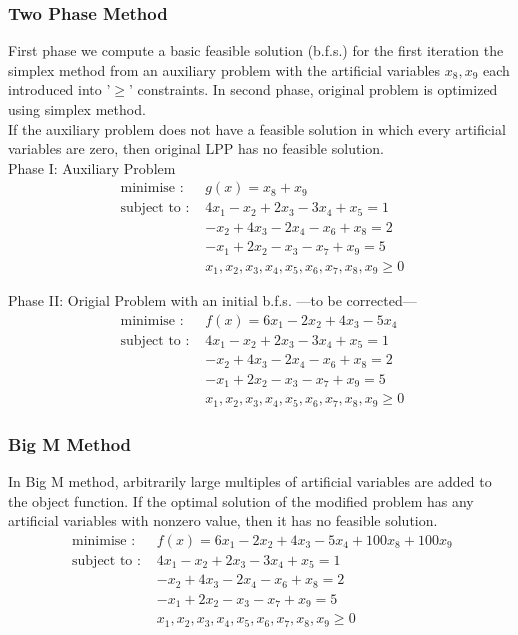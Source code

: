 \subsubsection{Two Phase Method}
First phase we compute a basic feasible solution (b.f.s.) for the first iteration the simplex method from an auxiliary problem with the artificial variables $x_8,x_9$ each introduced into '$\ge$' constraints. In second phase, original problem is optimized using simplex method.\\

	If the auxiliary problem does not have a feasible solution in which every artificial variables are zero, then original LPP has no feasible solution.\\

Phase I: Auxiliary Problem
\begin{align*}
	\text{ minimise : } & g(x) = x_8 + x_9 \\
\text{ subject to : } & 4x_1 - x_2 + 2x_3 - 3x_4 + x_5 = 1 \\
& -x_2 + 4x_3 - 2x_4 - x_6 + x_8 = 2 \\
& -x_1 + 2x_2 - x_3 - x_7 + x_9 = 5 \\
& x_1,x_2,x_3,x_4,x_5,x_6,x_7,x_8,x_9 \ge  0
\end{align*}

Phase II: Origial Problem with an initial b.f.s. 
---to be corrected---
\begin{align*}
	\text{ minimise : } & f(x) = 6x_1 - 2x_2 +4x_3 - 5x_4 \\
\text{ subject to : } & 4x_1 - x_2 + 2x_3 - 3x_4 + x_5 = 1 \\
& -x_2 + 4x_3 - 2x_4 - x_6 + x_8 = 2 \\
& -x_1 + 2x_2 - x_3 - x_7 + x_9 = 5 \\
& x_1,x_2,x_3,x_4,x_5,x_6,x_7,x_8,x_9 \ge  0
\end{align*}

\subsubsection{Big M Method}
In Big M method, arbitrarily large multiples of artificial variables are added to the object function. If the optimal solution of the modified problem has any artificial variables with nonzero value, then it has no feasible solution.
\begin{align*}
	\text{ minimise : } & f(x) = 6x_1 - 2x_2 +4x_3 - 5x_4 + 100x_8 + 100x_9 \\
\text{ subject to : } & 4x_1 - x_2 + 2x_3 - 3x_4 + x_5 = 1 \\
& -x_2 + 4x_3 - 2x_4 - x_6 + x_8 = 2 \\
& -x_1 + 2x_2 - x_3 - x_7 + x_9 = 5 \\
& x_1,x_2,x_3,x_4,x_5,x_6,x_7,x_8,x_9 \ge  0
\end{align*}

